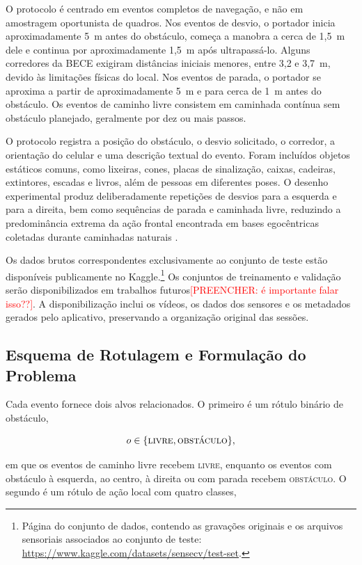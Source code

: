 \documentclass[conference]{IEEEtran}
\newcommand{\todo}[1]{\textcolor{red}{[PREENCHER: #1]}}
\begin{document}
O protocolo é centrado em eventos completos de navegação, e não em amostragem oportunista de quadros. Nos eventos de desvio, o portador inicia aproximadamente 5~m antes do obstáculo, começa a manobra a cerca de 1,5~m dele e continua por aproximadamente 1,5~m após ultrapassá-lo. Alguns corredores da BECE exigiram distâncias iniciais menores, entre 3,2 e 3,7~m, devido às limitações físicas do local. Nos eventos de parada, o portador se aproxima a partir de aproximadamente 5~m e para cerca de 1~m antes do obstáculo. Os eventos de caminho livre consistem em caminhada contínua sem obstáculo planejado, geralmente por dez ou mais passos.

O protocolo registra a posição do obstáculo, o desvio solicitado, o corredor, a orientação do celular e uma descrição textual do evento. Foram incluídos objetos estáticos comuns, como lixeiras, cones, placas de sinalização, caixas, cadeiras, extintores, escadas e livros, além de pessoas em diferentes poses. O desenho experimental produz deliberadamente repetições de desvios para a esquerda e para a direita, bem como sequências de parada e caminhada livre, reduzindo a predominância extrema da ação frontal encontrada em bases egocêntricas coletadas durante caminhadas naturais \cite{jadhav2025}.

Os dados brutos correspondentes exclusivamente ao conjunto de teste estão disponíveis publicamente no Kaggle.\footnote{Página do conjunto de dados, contendo as gravações originais e os arquivos sensoriais associados ao conjunto de teste: \url{https://www.kaggle.com/datasets/sensecv/test-set}.} Os conjuntos de treinamento e validação serão disponibilizados em trabalhos futuros\todo{é importante falar isso??}. A disponibilização inclui os vídeos, os dados dos sensores e os metadados gerados pelo aplicativo, preservando a organização original das sessões.

\subsection{Esquema de Rotulagem e Formulação do Problema}

Cada evento fornece dois alvos relacionados. O primeiro é um rótulo binário de obstáculo,

\begin{equation}
    o \in \{\textsc{livre},\textsc{obstáculo}\},
\end{equation}

em que os eventos de caminho livre recebem \textsc{livre}, enquanto os eventos com obstáculo à esquerda, ao centro, à direita ou com parada recebem \textsc{obstáculo}. O segundo é um rótulo de ação local com quatro classes,
\end{document}
